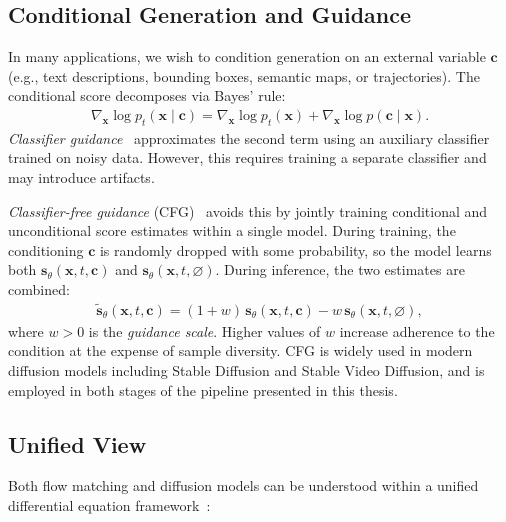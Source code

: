 \subsection{Conditional Generation and Guidance}
\label{subsec:cfg}

In many applications, we wish to condition generation on an external variable $\mathbf{c}$ (e.g., text descriptions, bounding boxes, semantic maps, or trajectories). The conditional score decomposes via Bayes' rule:
\begin{align}
    \nabla_{\mathbf{x}} \log p_t(\mathbf{x} \mid \mathbf{c}) = \nabla_{\mathbf{x}} \log p_t(\mathbf{x}) + \nabla_{\mathbf{x}} \log p(\mathbf{c} \mid \mathbf{x}).
    \label{eq:conditional_score}
\end{align}
\emph{Classifier guidance}~\cite{dhariwal2021diffusion} approximates the second term using an auxiliary classifier trained on noisy data. However, this requires training a separate classifier and may introduce artifacts.

\emph{Classifier-free guidance} (CFG)~\cite{ho2022classifierfree} avoids this by jointly training conditional and unconditional score estimates within a single model. During training, the conditioning $\mathbf{c}$ is randomly dropped with some probability, so the model learns both $\mathbf{s}_\theta(\mathbf{x}, t, \mathbf{c})$ and $\mathbf{s}_\theta(\mathbf{x}, t, \varnothing)$. During inference, the two estimates are combined:
\begin{align}
    \tilde{\mathbf{s}}_\theta(\mathbf{x}, t, \mathbf{c}) = (1 + w)\,\mathbf{s}_\theta(\mathbf{x}, t, \mathbf{c}) - w\,\mathbf{s}_\theta(\mathbf{x}, t, \varnothing),
    \label{eq:cfg}
\end{align}
where $w > 0$ is the \emph{guidance scale}. Higher values of $w$ increase adherence to the condition at the expense of sample diversity. CFG is widely used in modern diffusion models including Stable Diffusion and Stable Video Diffusion, and is employed in both stages of the pipeline presented in this thesis.

\subsection{Unified View}
\label{subsec:unified_view}

Both flow matching and diffusion models can be understood within a unified differential equation framework~\cite{lipman2023flow, song2021scorebased, albergo2023stochastic}:

